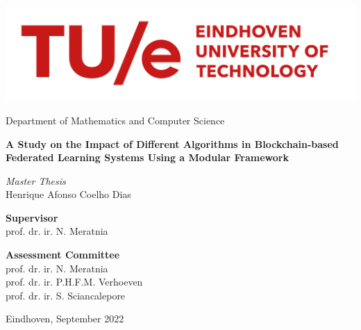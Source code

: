 \begin{titlepage}
\centering
\includegraphics[width=0.7\linewidth]{graphics/tue-logo.png}\par
Department of Mathematics and Computer Science

\vspace{3cm}

{\sffamily\LARGE\textbf{
A Study on the Impact of Different Algorithms in Blockchain-based Federated Learning Systems Using a Modular Framework
}}

\par\vspace{2cm}
{\large\textit{Master Thesis}}\\
\vspace{0.2cm}
{\large Henrique Afonso Coelho Dias}

\vspace{2cm}

\textbf{Supervisor} \\
\vspace{0.1cm}
prof. dr. ir. N. Meratnia

\par

\textbf{Assessment Committee} \\
\vspace{0.1cm}
prof. dr. ir. N. Meratnia \\
prof. dr. ir. P.H.F.M. Verhoeven \\
prof. dr. ir. S. Sciancalepore \\

\vfill

{Eindhoven, September 2022}

\end{titlepage}